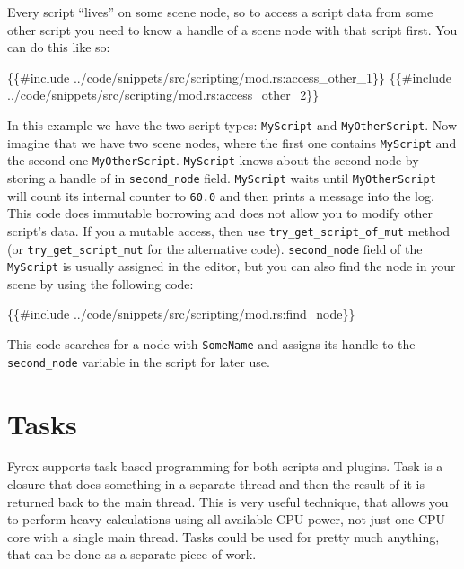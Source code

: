 \documentclass[
]{book}
\newenvironment{Shaded}{\begin{snugshade}}{\end{snugshade}}
\newcommand{\NormalTok}[1]{#1}
\theoremstyle{definition}
\theoremstyle{definition}
\theoremstyle{definition}
\theoremstyle{definition}
\theoremstyle{remark}
\begin{document}
Every script ``lives'' on some scene node, so to access a script data from some other script you need to know a handle of a scene node with that script first. You can do this like so:

\begin{Shaded}
\begin{Highlighting}[]
\NormalTok{\{\{\#include ../code/snippets/src/scripting/mod.rs:access\_other\_1\}\}}
\NormalTok{\{\{\#include ../code/snippets/src/scripting/mod.rs:access\_other\_2\}\}}
\end{Highlighting}
\end{Shaded}

In this example we have the two script types: \texttt{MyScript} and \texttt{MyOtherScript}. Now imagine that we have two scene nodes, where the first one contains \texttt{MyScript} and the second one \texttt{MyOtherScript}. \texttt{MyScript} knows about the second node by storing a handle of in \texttt{second\_node} field. \texttt{MyScript} waits until \texttt{MyOtherScript} will count its internal counter to \texttt{60.0} and then prints a message into the log. This code does immutable borrowing and does not allow you to modify other script's data. If you a mutable access, then use \texttt{try\_get\_script\_of\_mut} method (or \texttt{try\_get\_script\_mut} for the alternative code). \texttt{second\_node} field of the \texttt{MyScript} is usually assigned in the editor, but you can also find the node in your scene by using the following code:

\begin{Shaded}
\begin{Highlighting}[]
\NormalTok{\{\{\#include ../code/snippets/src/scripting/mod.rs:find\_node\}\}}
\end{Highlighting}
\end{Shaded}

This code searches for a node with \texttt{SomeName} and assigns its handle to the \texttt{second\_node} variable in the script for later use.

\section{Tasks}\label{tasks}

Fyrox supports task-based programming for both scripts and plugins. Task is a closure that does something in a separate thread and then the result of it is returned back to the main thread. This is very useful technique, that allows you to perform heavy calculations using all available CPU power, not just one CPU core with a single main thread. Tasks could be used for pretty much anything, that can be done as a separate piece of work.
\end{document}
